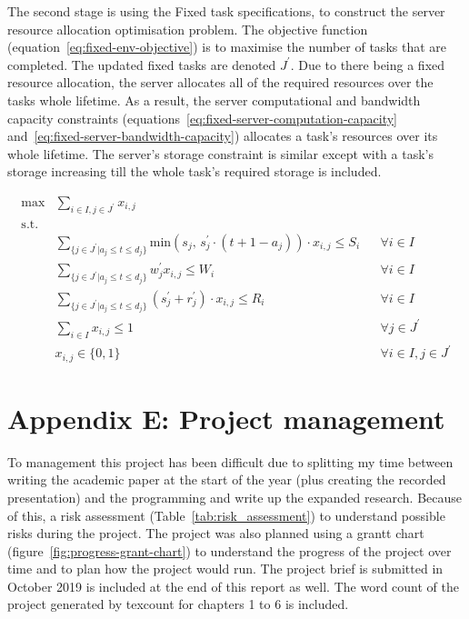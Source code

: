 The second stage is using the Fixed task specifications, to construct the server resource allocation optimisation
problem. The objective function (equation~\ref{eq:fixed-env-objective}) is to maximise the number of tasks that are
completed. The updated fixed tasks are denoted $J^{'}$. Due to there being a fixed resource allocation, the server
allocates all of the required resources over the tasks whole lifetime. As a result, the server computational and
bandwidth capacity constraints (equations~\ref{eq:fixed-server-computation-capacity}
and~\ref{eq:fixed-server-bandwidth-capacity}) allocates a task's resources over its whole lifetime. The server's storage
constraint is similar except with a task's storage increasing till the whole task's required storage is included.

\begin{align}
    \text{max} & \sum_{i \in I, j \in J^{'}} x_{i,j} \label{eq:fixed-env-objective} \\
    \mbox{s.t.} \nonumber \\
    & \sum_{\{j \in J^{'} | a_j \leq t \leq d_j\}} \text{min}(s_j \text{, } s^{'}_j \cdot (t + 1 - a_j)) \cdot x_{i,j} \leq S_i && \forall{i \in I} \label{eq:fixed-server-storage-capacity} \\
    & \sum_{\{j \in J^{'} | a_j \leq t \leq d_j\}} w^{'}_j x_{i,j} \leq W_i && \forall{i \in I} \label{eq:fixed-server-computation-capacity} \\
    & \sum_{\{j \in J^{'} | a_j \leq t \leq d_j\}} (s^{'}_j + r^{'}_j) \cdot x_{i,j} \leq R_i && \forall{i \in I} \label{eq:fixed-server-bandwidth-capacity} \\
    & \sum_{i \in I} x_{i,j} \leq 1 && \forall{j \in J^{'}} \label{eq:fixed-env-allocation-limit} \\
    & x_{i,j} \in \{0, 1\} && \forall{i \in I, j \in J^{'}} \label{eq:fixed-env-allocation-set}
\end{align}

\section*{Appendix E: Project management}
\label{app:project-management}
To management this project has been difficult due to splitting my time between writing the academic paper at the
start of the year (plus creating the recorded presentation) and the programming and write up the expanded research.
Because of this, a risk assessment (Table~\ref{tab:risk_assessment}) to understand possible risks during the project.
The project was also planned using a grantt chart (figure~\ref{fig:progress-grant-chart}) to understand the progress of
the project over time and to plan how the project would run. The project brief is submitted in October 2019
is included at the end of this report as well. The word count of the project generated by texcount for chapters 1 to 6
is included.

